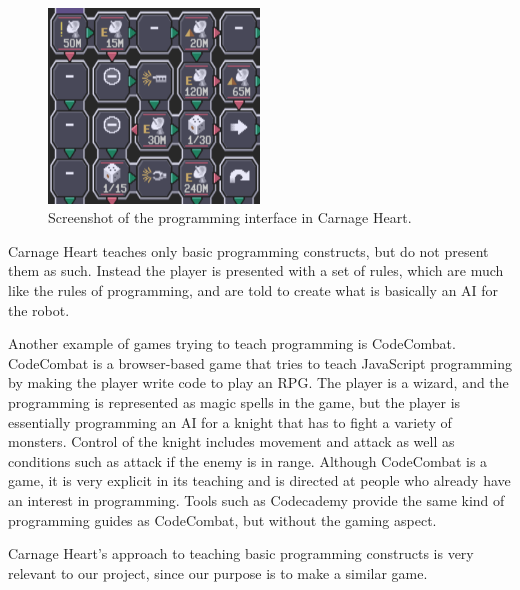 \begin{figure}[hptb]
  \centering
    \includegraphics[width=0.5\textwidth]{img/CarnageHeartSoftware.png}
  \caption{Screenshot of the programming interface in Carnage Heart.\cite{carnageheartsoftware}}
  \label{fig:carnageheartsoftware}
\end{figure}

Carnage Heart teaches only basic programming constructs, but do not present them as such. Instead the player is presented with a set of rules, which are much like the rules of programming, and are told to create what is basically an AI for the robot.

Another example of games trying to teach programming is CodeCombat. \cite{codecombat} CodeCombat is a browser-based game that tries to teach JavaScript programming by making the player write code to play an RPG. The player is a wizard, and the programming is represented as magic spells in the game, but the player is essentially programming an AI for a knight that has to fight a variety of monsters. Control of the knight includes movement and attack as well as conditions such as attack if the enemy is in range.
Although CodeCombat is a game, it is very explicit in its teaching and is directed at people who already have an interest in programming. Tools such as Codecademy provide the same kind of programming guides as CodeCombat, but without the gaming aspect.\cite{codecademy}

Carnage Heart's approach to teaching basic programming constructs is very relevant to our project, since our purpose is to make a similar game.